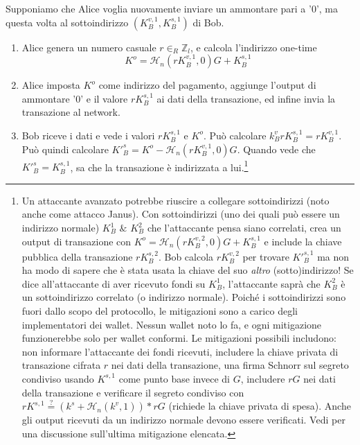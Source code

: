 Supponiamo che Alice voglia nuovamente inviare un ammontare pari a '0', ma questa volta al sottoindirizzo $(K_B^{v,1}, K_B^{s,1})$ di Bob.
\begin{enumerate}
	\item Alice genera un numero casuale $r \in_R \mathbb{Z}_l$, e calcola l'indirizzo one-time\vspace{.175cm}
	\[ K^o  = \mathcal{H}_n(r K_B^{v,1},0)G + K_B^{s,1} \]

	\item Alice imposta $K^o$ come indirizzo del pagamento, aggiunge l'output di ammontare '0' e il valore $r K_B^{s,1}$ ai dati della transazione, ed infine invia la transazione al network.
    	
    \item Bob riceve i dati e vede i valori $r K_B^{s,1}$ e $K^o$. Può calcolare $k_B^v r K_B^{s,1} = r K_B^{v,1}$. Può quindi calcolare $K'^{s}_B = K^o - \mathcal{H}_n(r K_B^{v,1},0)G$. Quando vede che $K'^{s}_B = K^{s,1}_B$, sa che la transazione è indirizzata a lui.\footnote{Un attaccante avanzato potrebbe riuscire a collegare sottoindirizzi \cite{janus-attack} (noto anche come attacco Janus). Con sottoindirizzi (uno dei quali può essere un indirizzo normale) $K_B^1$ $\&$ $K_B^2$ che l’attaccante pensa siano correlati, crea un output di transazione con $K^o = \mathcal{H}_n(r K_B^{v,2},0)G + K_B^{s,1}$ e include la chiave pubblica della transazione $r K_B^{s,2}$. Bob calcola $r K_B^{v,2}$ per trovare $K'^{s,1}_B$ ma non ha modo di sapere che è stata usata la chiave del suo {\em altro} (sotto)indirizzo! Se dice all’attaccante di aver ricevuto fondi su $K_B^1$, l’attaccante saprà che $K_B^2$ è un sottoindirizzo correlato (o indirizzo normale). Poiché i sottoindirizzi sono fuori dallo scopo del protocollo, le mitigazioni sono a carico degli implementatori dei wallet. Nessun wallet noto lo fa, e ogni mitigazione funzionerebbe solo per wallet conformi. Le mitigazioni possibili includono: non informare l’attaccante dei fondi ricevuti, includere la chiave privata di transazione cifrata $r$ nei dati della transazione, una firma Schnorr sul segreto condiviso usando $K^{s,1}$ come punto base invece di $G$, includere $rG$ nei dati della transazione e verificare il segreto condiviso con $rK^{s,1} \stackrel{?}{=} (k^s + \mathcal{H}_n(k^v, 1))*rG$ (richiede la chiave privata di spesa). Anche gli output ricevuti da un indirizzo normale devono essere verificati. Vedi \cite{janus-mitigation-issue-62} per una discussione sull’ultima mitigazione elencata.}


\end{enumerate}
